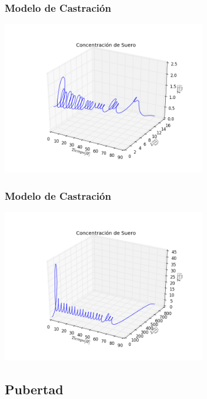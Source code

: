 \documentclass[10pt]{beamer}
\begin{document}
\begin{frame}
\frametitle{Modelo de Castración}
\begin{center}
 \includegraphics[width=3.5in]{imagenes/Graficas/Castracion/castracion_suero_primer_modelo_m_12.png}
\end{center}
\end{frame}

\begin{frame}
\frametitle{Modelo de Castración}
\begin{center}
 \includegraphics[width=3.5in]{imagenes/Graficas/Castracion/castracion_suero_segundo_modelo.png}
\end{center}
\end{frame}

\subsection{Pubertad}
\end{document}
